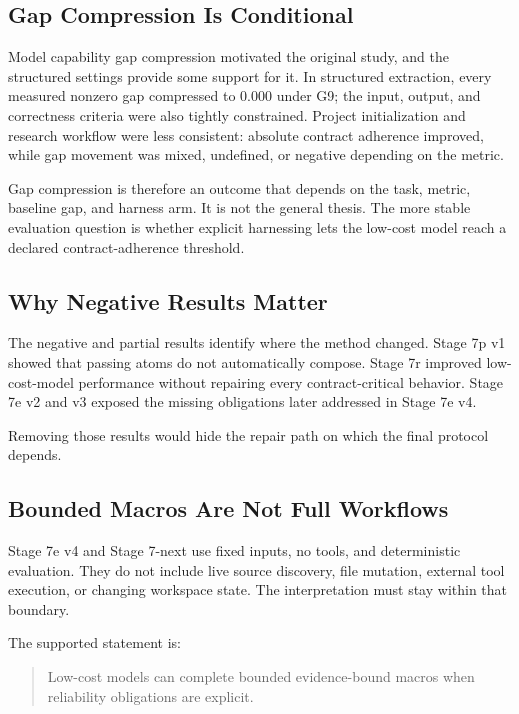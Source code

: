 \documentclass[11pt]{article}
\begin{document}
\subsection{Gap Compression Is Conditional}

Model capability gap compression motivated the original study, and the structured settings provide some support for it. In structured extraction, every measured nonzero gap compressed to 0.000 under G9; the input, output, and correctness criteria were also tightly constrained. Project initialization and research workflow were less consistent: absolute contract adherence improved, while gap movement was mixed, undefined, or negative depending on the metric.

Gap compression is therefore an outcome that depends on the task, metric, baseline gap, and harness arm. It is not the general thesis. The more stable evaluation question is whether explicit harnessing lets the low-cost model reach a declared contract-adherence threshold.

\subsection{Why Negative Results Matter}

The negative and partial results identify where the method changed. Stage 7p v1 showed that passing atoms do not automatically compose. Stage 7r improved low-cost-model performance without repairing every contract-critical behavior. Stage 7e v2 and v3 exposed the missing obligations later addressed in Stage 7e v4.

Removing those results would hide the repair path on which the final protocol depends.

\subsection{Bounded Macros Are Not Full Workflows}

Stage 7e v4 and Stage 7-next use fixed inputs, no tools, and deterministic evaluation. They do not include live source discovery, file mutation, external tool execution, or changing workspace state. The interpretation must stay within that boundary.

The supported statement is:

\begin{quote}
Low-cost models can complete bounded evidence-bound macros when reliability obligations are explicit.
\end{quote}
\end{document}
